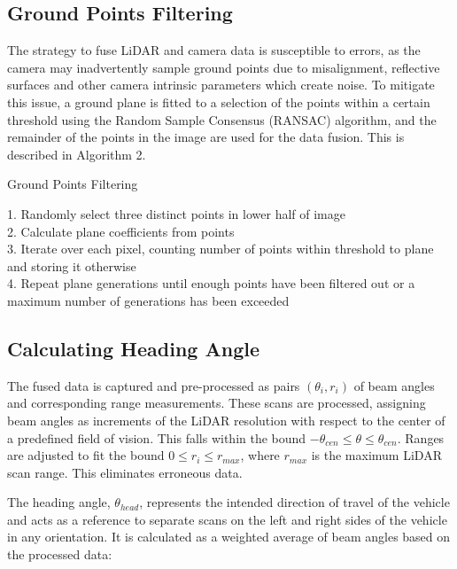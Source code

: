 \documentclass[conference]{IEEEtran}
\begin{document}
\subsection{Ground Points Filtering}


The strategy to fuse LiDAR and camera data is susceptible to errors, as the camera may inadvertently sample ground points due to misalignment, reflective surfaces and other camera intrinsic parameters which create noise. To mitigate this issue, a ground plane is fitted to a selection of the points within a certain threshold using the Random Sample Consensus (RANSAC) algorithm, and the remainder of the points in the image are used for the data fusion. This is described in Algorithm 2.


\begin{algorithm}
\caption{Ground Points Filtering}

        1. Randomly select three distinct points in lower half of image\\
        2. Calculate plane coefficients from points\\
        3. Iterate over each pixel, counting number of points within threshold to plane and storing it otherwise \\
        4. Repeat plane generations until enough points have been filtered out or a maximum number of generations has been exceeded \\

\end{algorithm}

\subsection{Calculating Heading Angle}

The fused data is captured and pre-processed as pairs $(\theta_i, r_i)$ of beam angles and corresponding range measurements. These scans are processed, assigning beam angles as increments of the LiDAR resolution with respect to the center of a predefined field of vision. This falls within the bound $-\theta_{cen} \leq \theta \leq \theta_{cen}$.  Ranges are adjusted to fit the bound $0 \leq r_i \leq r_{max}$, where $r_{max}$ is the maximum LiDAR scan range. This eliminates erroneous data.

The heading angle, $\theta_{head}$, represents the intended direction of travel of the vehicle and acts as a reference to separate scans on the left and right sides of the vehicle in any orientation. It is calculated as a weighted average of beam angles based on the processed data:
\end{document}
